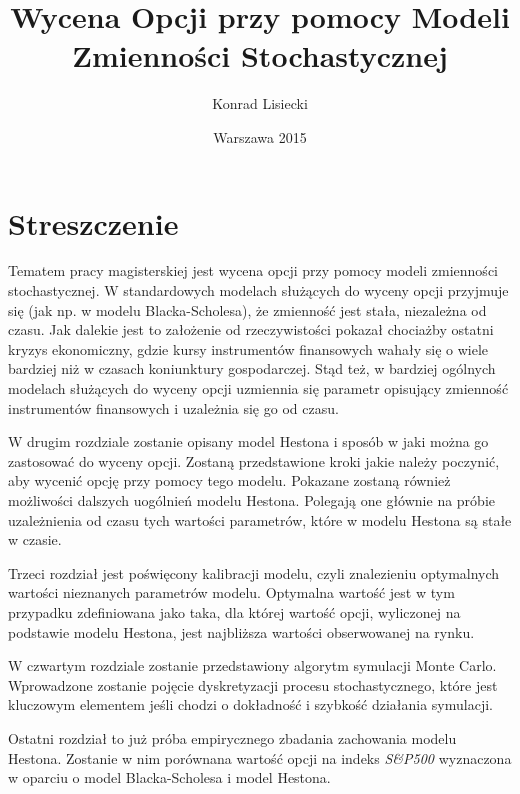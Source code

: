 \documentclass{pracamgr}
\author{Konrad Lisiecki}
\title{Wycena Opcji przy pomocy Modeli Zmienności Stochastycznej}
\date{Warszawa 2015}
\begin{document}
\maketitle

\cleardoublepage
{}
\chapter*{Streszczenie} 
 


Tematem pracy magisterskiej jest wycena opcji przy pomocy modeli zmienności stochastycznej. 
W standardowych modelach służących do wyceny opcji przyjmuje się (jak np. w modelu 
Blacka-Scholesa), że zmienność jest stała, niezależna od czasu. 
Jak dalekie jest to założenie od rzeczywistości pokazał chociażby ostatni kryzys 
ekonomiczny, gdzie kursy instrumentów finansowych wahały się o wiele bardziej niż w czasach
koniunktury gospodarczej. Stąd też, w bardziej ogólnych modelach służących do wyceny opcji uzmiennia 
się parametr opisujący zmienność instrumentów finansowych i uzależnia się go od czasu. 

W drugim rozdziale zostanie opisany model Hestona i sposób w jaki można go zastosować do wyceny 
opcji. Zostaną przedstawione kroki jakie należy poczynić, aby wycenić opcję przy pomocy tego modelu.
Pokazane zostaną również możliwości dalszych uogólnień modelu Hestona. 
Polegają one głównie na próbie uzależnienia od czasu tych wartości parametrów, które w 
modelu Hestona są stałe w czasie.

Trzeci rozdział jest poświęcony kalibracji modelu, czyli znalezieniu 
optymalnych wartości nieznanych parametrów modelu. Optymalna wartość jest w tym przypadku zdefiniowana
jako taka, dla której wartość opcji, wyliczonej na podstawie modelu Hestona, jest najbliższa wartości 
obserwowanej na rynku.

W czwartym rozdziale zostanie przedstawiony algorytm symulacji Monte Carlo. 
Wprowadzone zostanie pojęcie dyskretyzacji procesu stochastycznego, które jest kluczowym elementem
jeśli chodzi o dokładność i szybkość działania symulacji. 


Ostatni rozdział to już próba empirycznego zbadania zachowania modelu Hestona. Zostanie w nim 
porównana wartość opcji na indeks \textit{S\&P500} wyznaczona w oparciu o model Blacka-Scholesa i model 
Hestona.
\end{document}
